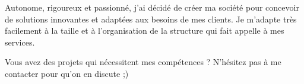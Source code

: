 

\begin{cvparagraph}

Autonome, rigoureux et passionné, j'ai décidé de créer ma société pour concevoir de solutions innovantes et adaptées aux besoins de mes clients. Je m'adapte très facilement à la taille et à l'organisation de la structure qui fait appelle à mes services.


Vous avez des projets qui nécessitent mes compétences ? N'hésitez pas à me contacter pour qu'on en discute ;)
\end{cvparagraph}
